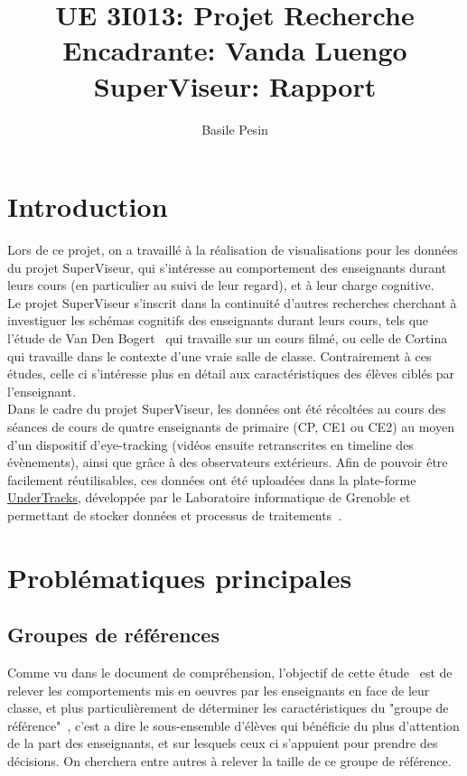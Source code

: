 \documentclass{article}
\title{UE 3I013: Projet Recherche\\
    Encadrante: Vanda Luengo\\
    SuperViseur: Rapport}
\author{Basile Pesin}
\begin{document}
\maketitle
\newpage

\tableofcontents
\newpage

\section{Introduction}
Lors de ce projet, on a travaillé à la réalisation de visualisations pour les données du projet SuperViseur, qui s'intéresse au comportement des enseignants durant leurs cours (en particulier au suivi de leur regard), et à leur charge cognitive.\\
Le projet SuperViseur s'inscrit dans la continuité d'autres recherches cherchant à investiguer les schémas cognitifs des enseignants durant leurs cours, tels que l'étude de Van Den Bogert~\cite{VanDenBogert} qui travaille sur un cours filmé, ou celle de Cortina~\cite{Cortina} qui travaille dans le contexte d'une vraie salle de classe. Contrairement à ces études, celle ci s'intéresse plus en détail aux caractéristiques des élèves ciblés par l'enseignant.\\
Dans le cadre du projet SuperViseur, les données ont été récoltées au cours des séances de cours de quatre enseignants de primaire (CP, CE1 ou CE2) au moyen d'un dispositif d'eye-tracking (vidéos ensuite retranscrites en timeline des évènements), ainsi que grâce à des observateurs extérieurs. Afin de pouvoir être facilement réutilisables, ces données ont été uploadées dans la plate-forme \href{https://undertracks.imag.fr/}{UnderTracks}, développée par le Laboratoire informatique de Grenoble et permettant de stocker données et processus de traitements~\cite{CPDEP}.

\section{Problématiques principales}

\subsection{Groupes de références}
Comme vu dans le document de compréhension, l'objectif de cette étude~\cite{SuperViseur} est de relever les comportements mis en oeuvres par les enseignants en face de leur classe, et plus particulièrement de déterminer les caractéristiques du "groupe de référence"~\cite{Cortina}, c'est a dire le sous-ensemble d'élèves qui bénéficie du plus d'attention de la part des enseignants, et sur lesquels ceux ci s'appuient pour prendre des décisions. On cherchera entre autres à relever la taille de ce groupe de référence.
\end{document}
